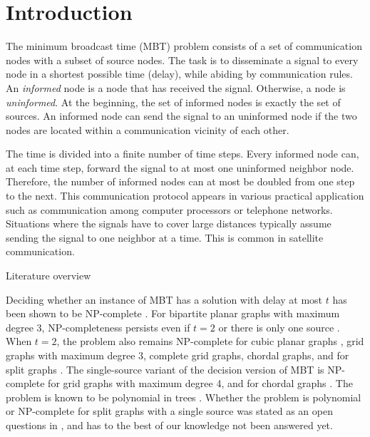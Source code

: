 \section{Introduction}
\label{intro}
The minimum broadcast time (MBT) problem consists of a set of communication nodes with a subset of source nodes. 
The task is to disseminate a signal to every node in a shortest possible time (delay), while abiding by communication rules.
An \emph{informed} node is a node that has received the signal.
Otherwise, a node is \emph{uninformed}.
At the beginning, the set of informed nodes is exactly the set of sources.
An informed node can send the signal to an uninformed node if the two nodes are located within a communication vicinity of each other.

The time is divided into a finite number of time steps.
Every informed node can, at each time step, forward the signal to at most one uninformed neighbor node.
Therefore, the number of informed nodes can at most be doubled from one step to the next.
This communication protocol appears in various practical application such as communication among computer processors or telephone networks.
Situations where the signals have to cover large distances typically assume sending the signal to one neighbor at a time.
This is common in satellite communication.

{Literature overview}

Deciding whether an instance of MBT has a solution with delay at most $t$ has been shown to be NP-complete \cite{slater81}. 
For bipartite planar graphs with maximum degree 3, NP-completeness persists even if $t=2$ or there is only one source \cite{jansen95}.
When $t=2$, the problem also remains NP-complete for cubic planar graphs \cite{middendorf93}, grid graphs with maximum degree 3,
complete grid graphs, chordal graphs, and for split graphs \cite{jansen95}. 
The single-source variant of the decision version of MBT is NP-complete for grid graphs with maximum degree 4, and for chordal graphs \cite{jansen95}.
The problem is known to be polynomial in trees \cite{slater81}.
Whether the problem is polynomial or NP-complete for split graphs with a single source was stated as an open questions in \cite{jansen95}, and has to the best of our knowledge not been answered yet.

